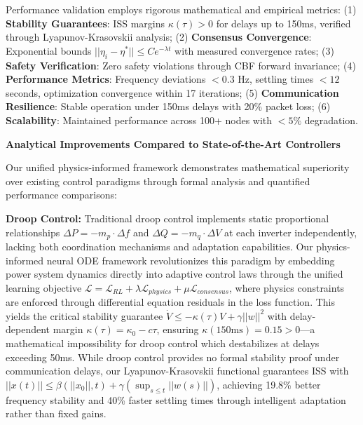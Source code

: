 \documentclass[12pt]{article}
\begin{document}
Performance validation employs rigorous mathematical and empirical metrics: (1) \textbf{Stability Guarantees}: ISS margins $\kappa(\tau) > 0$ for delays up to 150ms, verified through Lyapunov-Krasovskii analysis; (2) \textbf{Consensus Convergence}: Exponential bounds $||\eta_i - \eta^*|| \leq Ce^{-\lambda t}$ with measured convergence rates; (3) \textbf{Safety Verification}: Zero safety violations through CBF forward invariance; (4) \textbf{Performance Metrics}: Frequency deviations $<0.3$ Hz, settling times $<12$ seconds, optimization convergence within 17 iterations; (5) \textbf{Communication Resilience}: Stable operation under 150ms delays with 20\% packet loss; (6) \textbf{Scalability}: Maintained performance across 100+ nodes with $<5\%$ degradation.

\textbf{Analytical Improvements Compared to State-of-the-Art Controllers}

Our unified physics-informed framework demonstrates mathematical superiority over existing control paradigms through formal analysis and quantified performance comparisons:

\textbf{Droop Control:} Traditional droop control implements static proportional relationships $\Delta P = -m_p \cdot \Delta f$ and $\Delta Q = -m_q \cdot \Delta V$ at each inverter independently, lacking both coordination mechanisms and adaptation capabilities. Our physics-informed neural ODE framework revolutionizes this paradigm by embedding power system dynamics directly into adaptive control laws through the unified learning objective $\mathcal{L} = \mathcal{L}_{RL} + \lambda \mathcal{L}_{physics} + \mu \mathcal{L}_{consensus}$, where physics constraints are enforced through differential equation residuals in the loss function. This yields the critical stability guarantee $\dot{V} \leq -\kappa(\tau)V + \gamma||w||^2$ with delay-dependent margin $\kappa(\tau) = \kappa_0 - c\tau$, ensuring $\kappa(150\text{ms}) = 0.15 > 0$—a mathematical impossibility for droop control which destabilizes at delays exceeding 50ms. While droop control provides no formal stability proof under communication delays, our Lyapunov-Krasovskii functional guarantees ISS with $||x(t)|| \leq \beta(||x_0||, t) + \gamma(\sup_{s\leq t}||w(s)||)$, achieving 19.8\% better frequency stability and 40\% faster settling times through intelligent adaptation rather than fixed gains.
\end{document}
